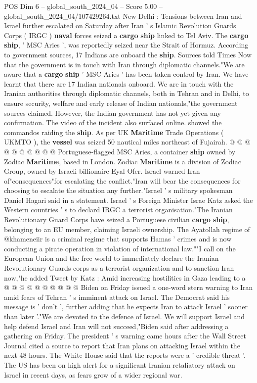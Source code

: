\begin{textsample}{POS Dim 6 – global\_south\_2024\_04 – Score 5.00 – global\_south\_2024\_04/107429264.txt}  \label{ex:f6_pos_129}
New Delhi : Tensions between Iran and Israel further escalated on Saturday after Iran ' s Islamic Revolution Guards Corps ( IRGC ) \textbf{naval} forces seized a \textbf{cargo} \textbf{ship} linked to Tel Aviv.
The \textbf{cargo} \textbf{ship}, ' MSC Aries ', was reportedly seized near the Strait of Hormuz.
According to government sources, 17 Indians are onboard the \textbf{ship}.
Sources told Times Now that the government is in touch with Iran through diplomatic channels."We are aware that a \textbf{cargo} \textbf{ship} ' MSC Aries ' has been taken control by Iran.
We have learnt that there are 17 Indian nationals onboard.
We are in touch with the Iranian authorities through diplomatic channels, both in Tehran and in Delhi, to ensure security, welfare and early release of Indian nationals,"the government sources claimed.
However, the Indian government has not yet given any confirmation.
The video of the incident also surfaced online. showed the commandos raiding the \textbf{ship}.
As per UK \textbf{Maritime} Trade Operations ( UKMTO ), the \textbf{vessel} was seized 50 nautical miles northeast of Fujairah. @ @ @ @ @ @ @ @ @ @ Portuguese-flagged MSC Aries, a container \textbf{ship} owned by Zodiac \textbf{Maritime}, based in London.
Zodiac \textbf{Maritime} is a division of Zodiac Group, owned by Israeli billionaire Eyal Ofer.
Israel warned Iran of"consequences"for escalating the conflict."Iran will bear the consequences for choosing to escalate the situation any further."Israel ' s military spokesman Daniel Hagari said in a statement.
Israel ' s Foreign Minister Israe Katz asked the Western countries ' s to declard IRGC a terrorist organisation."The Iranian Revolutionary Guard Corps have seized a Portuguese civilian \textbf{cargo} \textbf{ship}, belonging to an EU member, claiming Israeli ownership.
The Ayatollah regime of @khameneiir is a criminal regime that supports Hamas ' crimes and is now conducting a pirate operation in violation of international law.""I call on the European Union and the free world to immediately declare the Iranian Revolutionary Guards corps as a terrorist organization and to sanction Iran now,"he added Tweet by Katz : Amid increasing hostilities in Gaza leading to a @ @ @ @ @ @ @ @ @ @ Biden on Friday issued a one-word stern warning to Iran amid fears of Tehran ' s imminent attack on Israel.
The Democrat said his message is ' don't ', further adding that he expects Iran to attack Israel ' sooner than later '."We are devoted to the defence of Israel.
We will support Israel and help defend Israel and Iran will not succeed,"Biden said after addressing a gathering on Friday.
The president ' s warning came hours after the Wall Street Journal cited a source to report that Iran plans on attacking Israel within the next 48 hours.
The White House said that the reports were a ' credible threat '.
The US has been on high alert for a significant Iranian retaliatory attack on Israel in recent days, as fears grow of a wider regional war.

\end{textsample}
